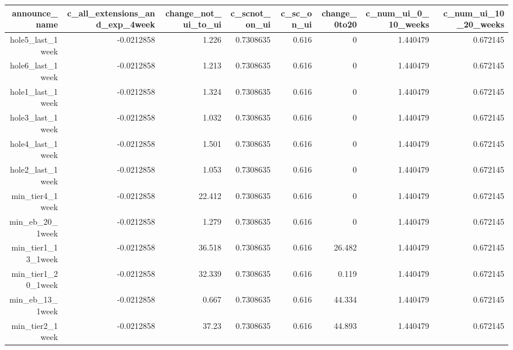 \begin{tabular}{rrrrrrrr}
\toprule
announce\_name & c\_all\_extensions\_and\_exp\_4week & change\_not\_ui\_to\_ui & c\_scnot\_on\_ui & c\_sc\_on\_ui & change\_0to20 & c\_num\_ui\_0\_10\_weeks & c\_num\_ui\_10\_20\_weeks \\
\midrule
hole5\_last\_1week & -0.0212858 & 1.226 & 0.7308635 & 0.616 & 0     & 1.440479 & 0.672145 \\
hole6\_last\_1week & -0.0212858 & 1.213 & 0.7308635 & 0.616 & 0     & 1.440479 & 0.672145 \\
hole1\_last\_1week & -0.0212858 & 1.324 & 0.7308635 & 0.616 & 0     & 1.440479 & 0.672145 \\
hole3\_last\_1week & -0.0212858 & 1.032 & 0.7308635 & 0.616 & 0     & 1.440479 & 0.672145 \\
hole4\_last\_1week & -0.0212858 & 1.501 & 0.7308635 & 0.616 & 0     & 1.440479 & 0.672145 \\
hole2\_last\_1week & -0.0212858 & 1.053 & 0.7308635 & 0.616 & 0     & 1.440479 & 0.672145 \\
min\_tier4\_1week & -0.0212858 & 22.412 & 0.7308635 & 0.616 & 0     & 1.440479 & 0.672145 \\
min\_eb\_20\_1week & -0.0212858 & 1.279 & 0.7308635 & 0.616 & 0     & 1.440479 & 0.672145 \\
min\_tier1\_13\_1week & -0.0212858 & 36.518 & 0.7308635 & 0.616 & 26.482 & 1.440479 & 0.672145 \\
min\_tier1\_20\_1week & -0.0212858 & 32.339 & 0.7308635 & 0.616 & 0.119 & 1.440479 & 0.672145 \\
min\_eb\_13\_1week & -0.0212858 & 0.667 & 0.7308635 & 0.616 & 44.334 & 1.440479 & 0.672145 \\
min\_tier2\_1week & -0.0212858 & 37.23 & 0.7308635 & 0.616 & 44.893 & 1.440479 & 0.672145 \\
\bottomrule
\end{tabular}%
